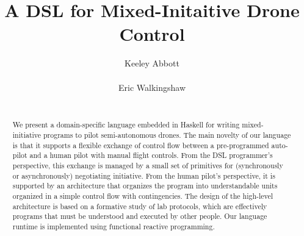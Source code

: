 \documentclass{sig-alternate-05-2015}
\begin{document}




\title{A DSL for Mixed-Initaitive Drone Control}

\author{
\alignauthor
Keeley Abbott\\
\\
\alignauthor
Eric Walkingshaw\\
\\
}

\maketitle
\begin{abstract}
%
We present a domain-specific language embedded in Haskell for writing
mixed-initiative programs to pilot semi-autono\-mous drones. The main novelty of
our language is that it supports a flexible exchange of control flow between a
pre-programmed auto-pilot and a human pilot with manual flight controls. From
the DSL programmer's perspective, this exchange is managed by a small set of
primitives for (synchronously or asynchronously) negotiating initiative. From
the human pilot's perspective, it is supported by an architecture that
organizes the program into understandable units organized in a simple control
flow with contingencies. The design of the high-level architecture is based on
a formative study of lab protocols, which are effectively programs that must be
understood and executed by other people.
%
Our language runtime is implemented using functional reactive programming.
%
\end{abstract}
\end{document}
